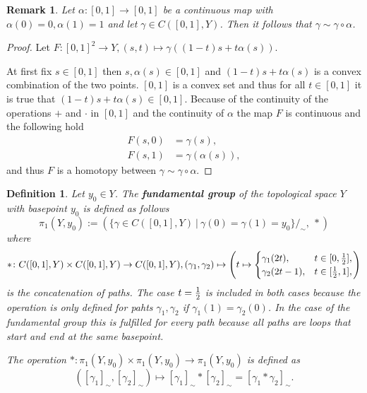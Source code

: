 \documentclass[a4paper, 11pt, twoside]{article}
\theoremstyle{break}
\theoremstyle{break}
\newtheorem{defin}[thm]{Definition}
\newtheorem{rem}[thm]{Remark}
\begin{document}
\begin{rem} \label{rem:reparam}
  Let $\alpha: [0,1] \to [0,1]$ be a continuous map with $\alpha(0) = 0, \alpha(1) = 1$ and let $\gamma \in C([0,1], Y)$. Then it follows that $\gamma \sim \gamma \circ \alpha$.
\end{rem}

\begin{proof}
  Let $F\colon [0,1]^2 \to Y, (s, t) \mapsto \gamma((1 - t)s + t\alpha(s))$.

  At first fix $s \in [0,1]$ then $s, \alpha(s) \in [0,1]$ and $(1 - t)s + t\alpha(s)$ is a convex combination of the two points. 
  $[0,1]$ is a convex set and thus for all $t\in[0,1]$ it is true that $(1 - t)s + t\alpha(s) \in [0,1]$. Because of the continuity of the operations $+$ and $\cdot$ in $[0,1]$ 
  and the continuity of $\alpha$ the map $F$ is continuous and the following hold
  \begin{align*}
    F(s, 0) &= \gamma(s), \\
    F(s, 1) &= \gamma(\alpha(s)),
  \end{align*}
  and thus $F$ is a homotopy between $\gamma \sim \gamma \circ \alpha$.
\end{proof}

\begin{defin}
  Let $y_0 \in Y$. The \textbf{fundamental group} of the topological space $Y$ with basepoint $y_0$ is defined as follows
  \begin{equation*}
    \pi_1(Y, y_0) := (\{\gamma \in C([0,1],Y) \: | \: \gamma(0) = \gamma(1) = y_0\}/_{\sim}, \: *)
  \end{equation*}
  where 
  \begin{equation*} 
    *\colon C([0,1], Y) \times C([0,1], Y) \to C([0,1], Y), (\gamma_1, \gamma_2) \mapsto \left(t \mapsto \begin{cases}
    \gamma_1(2t),   &t \in [0, {1 \over 2}], \\
    \gamma_2(2t-1), &t \in [{1 \over 2}, 1],
  \end{cases}\right)
\end{equation*}
is the concatenation of paths. The case $t = {1\over2}$ is included in both cases because the operation is only defined for pahts $\gamma_1, \gamma_2$ if $\gamma_1(1) = \gamma_2(0)$. 
In the case of the fundamental group this is fulfilled for every path because all paths are loops that start and end at the same basepoint.

The operation $*\colon \pi_1(Y, y_0) \times \pi_1(Y, y_0) \to \pi_1(Y, y_0)$ is defined as
\begin{equation*}
  ([\gamma_1]_{\sim}, [\gamma_2]_{\sim}) \mapsto [\gamma_1]_{\sim} * [\gamma_2]_{\sim} = [\gamma_1 * \gamma_2]_{\sim}.
\end{equation*} 
\end{defin}
\end{document}
